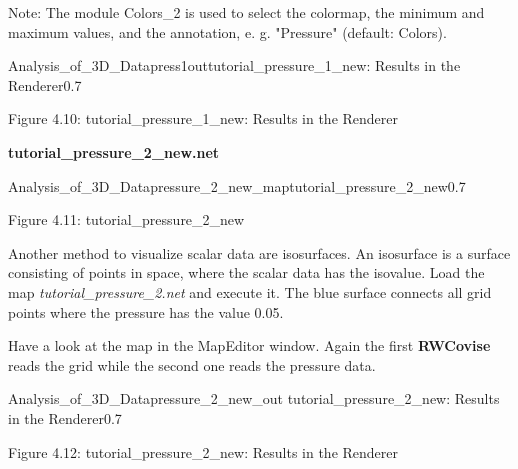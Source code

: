 Note: The module Colors\_2 is used to select the colormap, the minimum and maximum
values, and the annotation, e. g. "Pressure" (default: Colors). 

\begin{covimg}{Analysis_of_3D_Data}{press1out}{tutorial\_pressure\_1\_new: Results in the Renderer}{0.7}\end{covimg}
\begin{htmlonly}
Figure 4.10: tutorial_pressure_1\_new: Results in the Renderer
\vspace{0.5cm}
\end{htmlonly}


\vspace{1cm}
\begin{Large}{\bf tutorial\_pressure\_2\_new.net}\end{Large}
\vspace{0.5cm}

\begin{covimg}{Analysis_of_3D_Data}{pressure_2_new_map}{tutorial\_pressure\_2\_new}{0.7}\end{covimg}
\begin{htmlonly}
Figure 4.11: tutorial_pressure_2_new
\vspace{0.5cm}
\end{htmlonly}
                                                                                              

Another method to visualize scalar data are isosurfaces. An isosurface is a surface 
consisting of points in space, where the scalar data has the isovalue. Load the map 
{\it tutorial\_pressure\_2.net} and execute it. The blue surface connects all grid 
points where the pressure has the value 0.05.

Have a look at the map in the MapEditor window. Again the first {\bf RWCovise}
reads the grid while the second one reads the pressure data. 

                                             
\begin{covimg}{Analysis_of_3D_Data}{pressure_2_new_out}
                {tutorial\_pressure\_2\_new: Results in the Renderer}{0.7}\end{covimg}                                                                                          
\begin{htmlonly}
Figure 4.12: tutorial_pressure_2_new: Results in the Renderer
\vspace{0.5cm}
\end{htmlonly}                                                                                                                                                                                          

